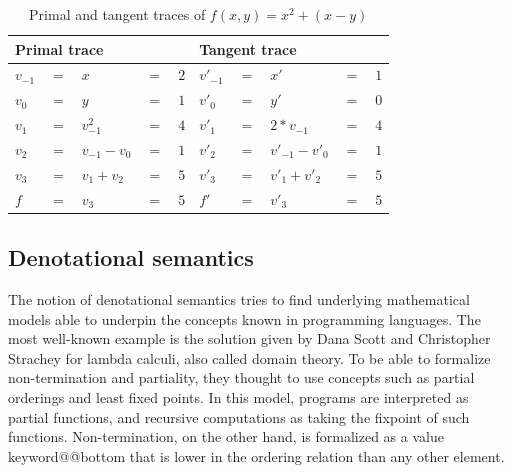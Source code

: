 \documentclass[11pt, final]{article}
\makeatletter
\def\<#1>{\csname keyword@@#1\endcsname}
\makeatother
\begin{document}
\begin{table}
  \begin{center}
    \begin{tabular}{ l l l l l | l l l l l }
      \hline
      \multicolumn{5}{l}{Primal trace} & \multicolumn{5}{l}{Tangent trace} \\
      \hline
$v_{-1} $&$=$&$x$&$=$&$2$             &$v'_{-1}$&$=$&$x'$&$=$&$1$ \\
$v_0    $&$=$&$y$&$=$&$1$             &$v'_{0}$&$=$&$y'$&$=$&$0$ \\
      \hline
$v_1    $&$=$&$v_{-1}^2$&$=$&$4$      &$v'_{1}$&$=$&$2*v_{-1}$&$=$&$4$ \\
$v_2    $&$=$&$v_{-1} - v_{0}$&$=$&$1$&$v'_{2}$&$=$&$v'_{-1}-v'_{0}$&$=$&$1$ \\
$v_3    $&$=$&$v_1 + v_2$&$=$&$5$     &$v'_{3}$&$=$&$v'_1 + v'_2$&$=$&$5$ \\
      \hline
$f      $&$=$&$v_3$&$=$&$5$           &$f'$&$=$&$v'_3$&$=$&$5$ \\
      \hline
    \end{tabular}
  \end{center}
  \caption{Primal and tangent traces of $f(x, y) = x^2 + (x - y)$}
  \label{table:func_trace}
\end{table}

\subsection{Denotational semantics}

The notion of denotational semantics tries to find underlying mathematical models able to underpin the concepts known in programming languages. The most well-known example is the solution given by Dana Scott and Christopher Strachey\cite{Scott1977} for lambda calculi, also called domain theory.
To be able to formalize non-termination and partiality, they thought to use concepts such as partial orderings and least fixed points\cite{aaby2020}.
In this model, programs are interpreted as partial functions, and recursive computations as taking the fixpoint of such functions.
Non-termination, on the other hand, is formalized as a value \<bottom> that is lower in the ordering relation than any other element.
\end{document}
